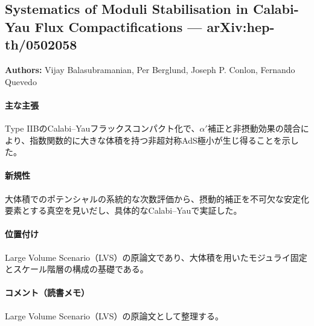 \subsection{Systematics of Moduli Stabilisation in Calabi-Yau Flux Compactifications --- arXiv:hep-th/0502058}

\textbf{Authors:} Vijay Balasubramanian, Per Berglund, Joseph P. Conlon, Fernando Quevedo

\paragraph{主な主張}
Type IIBのCalabi--Yauフラックスコンパクト化で、\(\alpha'\)補正と非摂動効果の競合により、指数関数的に大きな体積を持つ非超対称AdS極小が生じ得ることを示した。 \cite{Balasubramanian:2005zx}

\paragraph{新規性}
大体積でのポテンシャルの系統的な次数評価から、摂動的補正を不可欠な安定化要素とする真空を見いだし、具体的なCalabi--Yauで実証した。

\paragraph{位置付け}
Large Volume Scenario（LVS）の原論文であり、大体積を用いたモジュライ固定とスケール階層の構成の基礎である。

\paragraph{コメント（読書メモ）}
Large Volume Scenario（LVS）の原論文として整理する。
